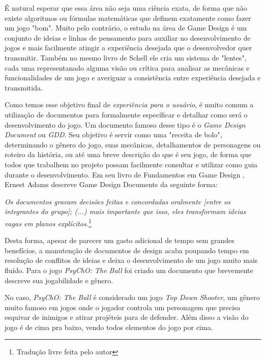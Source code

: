 É natural esperar que essa área não seja uma ciência exata, de forma que não existe algoritmos ou fórmulas matemáticas que definem exatamente como fazer um jogo "bom". Muito pelo contrário, o estudo na área de Game Design é um conjunto de ideias e linhas de pensamento para auxiliar no desenvolvimento de jogos e mais facilmente atingir a experiência desejada que o desenvolvedor quer transmitir. Também no mesmo livro de Schell \cite{jessegamedesign} ele cria um sistema de "lentes", cada uma representanado alguma visão ou crítica para analisar as mecânicas e funcionalidades de um jogo e averiguar a consistência entre experiência desejada e transmitida.

Como temos esse objetivo final de \textit{experiência para o usuário}, é muito comum a utilização de documentos para formalmente específicar e detalhar como será o desenvolvimento do jogo. Um documento famoso desse tipo é o \textit{Game Design Document} ou \textit{GDD}. Seu objetivo é servir como uma "receita de bolo", determinando o gênero do jogo, suas mecânicas, detalhamentos de personagens ou roteiro da história, ou até uma breve descrição do que é seu jogo, de forma que todos que trabalhem no projeto possam facilmente consultar e utilizar como guia durante o desenvolvimento. Em seu livro de Fundamentos em Game Design \cite{ernestgamedesign}, Ernest Adams descreve Game Design Documents da seguinte forma:

\begin{displayquote}
  \textit{Os documentos gravam decisões feitas e concordadas oralmente [entre os integrantes do grupo]; (...) mais importante que isso, eles transformam ideias vagas em planos explícitos.}\footnote{Tradução livre feita pelo autor}
\end{displayquote}

Desta forma, apesar de parecer um gasto adicional de tempo sem grandes benefícios, a manutenção de documentos de design acaba poupando tempo em resolução de conflitos de ideias e deixa o desenvolvimento de um jogo muito mais fluído. Para o jogo \textit{PsyChO: The Ball} foi criado um documento que brevemente descreve sua jogabilidade e gênero.

No caso, \textit{PsyChO: The Ball} é considerado um jogo \textit{Top Down Shooter}, um gênero muito famoso em jogos onde o jogador controla um personagem que precisa esquivar de inimigos e atirar projéteis para de defender. Além disso a visão do jogo é de cima pra baixo, vendo todos elementos do jogo por cima.\\

